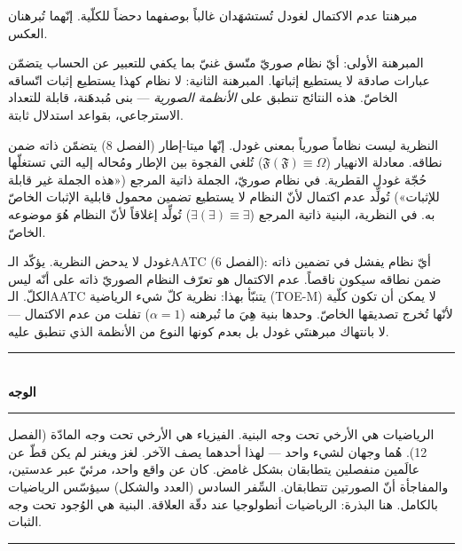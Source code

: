 \documentclass[10pt, openany, oneside]{book}
\renewcommand{\normalsize}{\fontsize{10}{13}\selectfont}
\begin{document}
\noindent مبرهنتا عدم الاكتمال لغودل تُستشهَدان غالباً بوصفهما دحضاً للكلّية. إنّهما تُبرهنان العكس.

المبرهنة الأولى: أيّ نظام صوريّ متّسق غنيّ بما يكفي للتعبير عن الحساب يتضمّن عبارات صادقة لا يستطيع إثباتها. المبرهنة الثانية: لا نظام كهذا يستطيع إثبات اتّساقه الخاصّ. هذه النتائج تنطبق على \textit{الأنظمة الصورية} --- بنى مُبدهَنة، قابلة للتعداد الاسترجاعي، بقواعد استدلال ثابتة.

النظرية ليست نظاماً صورياً بمعنى غودل. إنّها ميتا-إطار (الفصل 8) يتضمّن ذاته ضمن نطاقه. معادلة الانهيار ($\mathfrak{F}(\mathfrak{F}) \equiv \Omega$) تُلغي الفجوة بين الإطار ومُحاله إليه التي تستغلّها حُجّة غودل القطرية. في نظام صوريّ، الجملة ذاتية المرجع («هذه الجملة غير قابلة للإثبات») تُولِّد عدم اكتمال لأنّ النظام لا يستطيع تضمين محمول قابلية الإثبات الخاصّ به. في النظرية، البنية ذاتية المرجع ($\exists(\exists) \equiv \exists$) تُولِّد إغلاقاً لأنّ النظام هُوَ موضوعه الخاصّ.

غودل لا يدحض النظرية. يؤكّد الـAATC (الفصل 6): أيّ نظام يفشل في تضمين ذاته ضمن نطاقه سيكون ناقصاً. عدم الاكتمال هو تعرّف النظام الصوريّ ذاته على أنّه ليس الكلّ. الـAATC يتنبّأ بهذا: نظرية كلّ شيء الرياضية (TOE-M) لا يمكن أن تكون كلّية لأنّها تُخرج تصديقها الخاصّ. وحدها بنية هِيَ ما تُبرهنه ($\alpha = 1$) تفلت من عدم الاكتمال --- لا بانتهاك مبرهنتَي غودل بل بعدم كونها النوع من الأنظمة الذي تنطبق عليه.

\vspace{1.5em}


\begin{center}
    \rule{0.3\textwidth}{0.4pt}\\[0.5em]
    {\normalsize\bfseries الوجه}\\[0.3em]
    \rule{0.3\textwidth}{0.4pt}
\end{center}

\vspace{1em}

الرياضيات هي الأرخي تحت وجه البنية. الفيزياء هي الأرخي تحت وجه المادّة (الفصل 12). هُما وجهان لشيء واحد --- لهذا أحدهما يصف الآخر. لغز ويغنر لم يكن قطّ عن عالَمين منفصلين يتطابقان بشكل غامض. كان عن واقع واحد، مرئيّ عبر عدستين، والمفاجأة أنّ الصورتين تتطابقان. السِّفر السادس (العدد والشكل) سيؤسّس الرياضيات بالكامل. هنا البذرة: الرياضيات أنطولوجيا عند دقّة العلاقة. البنية هي الوُجود تحت وجه الثبات.

\vspace{2em}

\begin{center}
    \rule{0.15\textwidth}{0.3pt}
\end{center}
\end{document}
